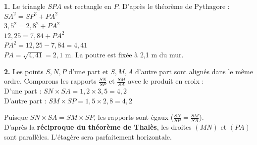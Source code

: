 \documentclass[a4paper]{book}
\begin{document}
\begin{exercice}
    \begin{minipage}{0.65\textwidth}
        \textbf{1.} Le triangle $SPA$ est rectangle en $P$. D'après le théorème de Pythagore :\\
        $SA^2 = SP^2 + PA^2$\\
        $3,5^2 = 2,8^2 + PA^2$\\
        $12,25 = 7,84 + PA^2$\\
        $PA^2 = 12,25 - 7,84 = 4,41$\\
        $PA = \sqrt{4,41} = 2,1$ m. La poutre est fixée à 2,1 m du mur.
        
        \vspace{0.3cm}
        \textbf{2.} Les points $S, N, P$ d'une part et $S, M, A$ d'autre part sont alignés dans le même ordre.
        Comparons les rapports $\frac{SN}{SP}$ et $\frac{SM}{SA}$ avec le produit en croix :\\
        D'une part : $SN \times SA = 1,2 \times 3,5 = 4,2$\\
        D'autre part : $SM \times SP = 1,5 \times 2,8 = 4,2$
        
        Puisque $SN \times SA = SM \times SP$, les rapports sont égaux ($\frac{SN}{SP} = \frac{SM}{SA}$).\\
        D'après la \textbf{réciproque du théorème de Thalès}, les droites $(MN)$ et $(PA)$ sont parallèles. L'étagère sera parfaitement horizontale.
    \end{minipage}
    \hfill
    \begin{minipage}{0.3\textwidth}
        \begin{center}
        \end{center}
    \end{minipage}
\end{exercice}
\end{document}
